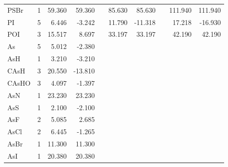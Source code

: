 \begin{table}
\begin{center}
\begin{tabular}{lrrrrrrrrr}
      PSBr    &      1 &   59.360 &   59.360 &  &   85.630 &   85.630 &  &  111.940 &  111.940 \\
      PI      &      5 &    6.446 &   -3.242 &  &   11.790 &  -11.318 &  &   17.218 &  -16.930 \\
      POI     &      3 &   15.517 &    8.697 &  &   33.197 &   33.197 &  &   42.190 &   42.190 \\
  As        &   5 &    5.012 &   -2.380 &     &          &          &     &          &          \\
  AsH       &   1 &    3.210 &   -3.210 &     &          &          &     &          &          \\
  CAsH      &   3 &   20.550 &  -13.810 &     &          &          &     &          &          \\
  CAsHO     &   3 &    4.097 &   -1.397 &     &          &          &     &          &          \\
  AsN       &   1 &   23.230 &   23.230 &     &          &          &     &          &          \\
  AsS       &   1 &    2.100 &   -2.100 &     &          &          &     &          &          \\
  AsF       &   2 &    5.085 &    2.685 &     &          &          &     &          &          \\
  AsCl      &   2 &    6.445 &   -1.265 &     &          &          &     &          &          \\
  AsBr      &   1 &   11.300 &   11.300 &     &          &          &     &          &          \\
  AsI       &   1 &   20.380 &   20.380 &     &          &          &     &          &          \\
\hline
\end{tabular}
\end{center}
\end{table}

